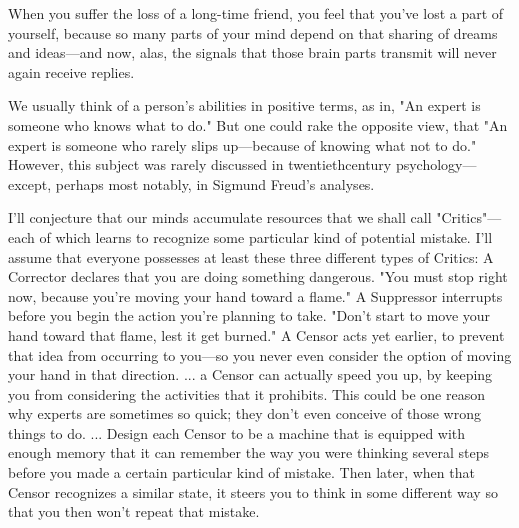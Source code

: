 \documentclass[10pt,a4paper]{article}
\begin{document}
When you suffer the loss of a long-time friend, you feel that you've lost a part of yourself, because so many parts of your mind depend on that sharing of dreams and ideas—and now, alas, the signals that those brain parts transmit will never again receive replies. \cite[p.~80]{minsky}

We usually think of a person's abilities in positive terms, as in, "An expert is someone who knows what to do." But one could rake the opposite view, that "An expert is someone who rarely slips up—because of knowing what not to do." However, this subject was rarely discussed in twentiethcentury psychology—except, perhaps most notably, in Sigmund Freud's analyses. \cite[p.~81]{minsky}

I'll conjecture that our minds accumulate resources that we shall call "Critics"—each of which learns to recognize some particular kind of potential mistake. I'll assume that everyone possesses at least these three different types of Critics:
A Corrector declares that you are doing something dangerous. "You must stop right now, because you're moving your hand toward a flame."
A Suppressor interrupts before you begin the action you're planning to take. "Don't start to move your hand toward that flame, lest it get burned."
A Censor acts yet earlier, to prevent that idea from occurring to you—so you never even consider the option of moving your hand in that direction.
...
a Censor can actually speed you up, by keeping you from considering the activities that it prohibits. This could be one reason why experts are sometimes so quick; they don't even conceive of those wrong things to do.
...
Design each Censor to be a machine that is equipped with enough memory that it can remember the way you were thinking several steps before you made a certain particular kind of mistake. Then later, when that Censor recognizes a similar state, it steers you to think in some different way so that you then won't repeat that mistake.\cite[p.~81-82]{minsky}
\end{document}
